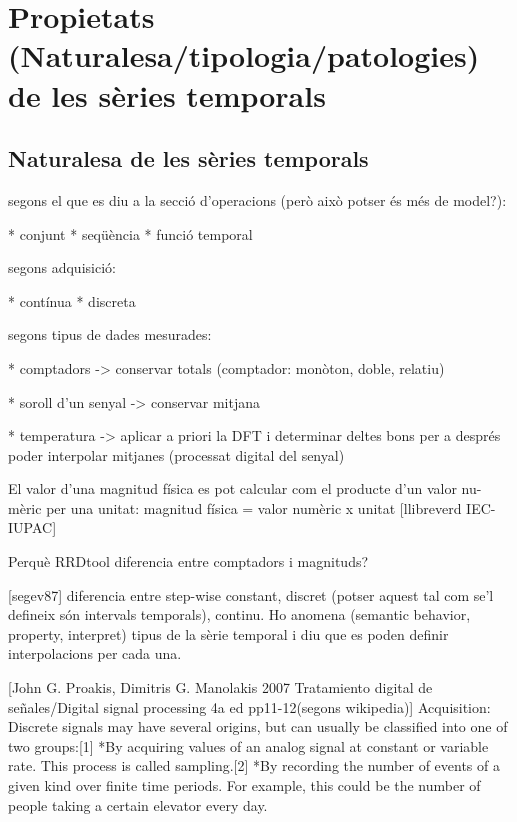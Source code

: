 \section{Propietats (Naturalesa/tipologia/patologies) de les sèries temporals}


\todo{}



\subsection{Naturalesa de les sèries temporals}

\todo{}


segons el que es diu a la secció d'operacions (però això potser és més de model?):

* conjunt
* seqüència
* funció temporal

segons adquisició:

* contínua
* discreta


segons tipus de dades mesurades:

* comptadors -> conservar totals (comptador: monòton, doble, relatiu)

* soroll d'un senyal -> conservar mitjana

* temperatura -> aplicar a priori la DFT i determinar deltes bons per a després poder interpolar mitjanes (processat digital del senyal)


El valor d’una magnitud física es pot calcular com el producte d’un valor nu-
mèric per una unitat:
magnitud física = valor numèric x unitat [llibreverd IEC-IUPAC]



Perquè RRDtool diferencia entre comptadors i magnituds?

[segev87] diferencia entre step-wise constant, discret (potser aquest tal com se'l defineix són intervals temporals), continu. Ho anomena (semantic behavior, property, interpret)
 tipus de la sèrie temporal i diu que es poden definir interpolacions per cada una.




[John G. Proakis, Dimitris G. Manolakis 2007 Tratamiento digital de señales/Digital signal processing 4a ed pp11-12(segons wikipedia)] Acquisition: Discrete signals may have several origins, but can usually be classified into one of two groups:[1]
*By acquiring values of an analog signal at constant or variable rate. This process is called sampling.[2]
*By recording the number of events of a given kind over finite time periods. For example, this could be the number of people taking a certain elevator every day.







